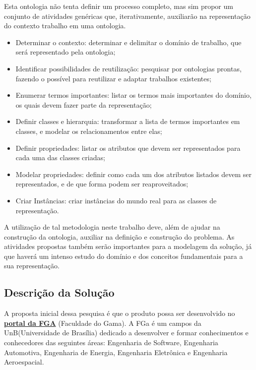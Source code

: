 Esta ontologia não tenta definir um processo completo, mas sim propor um conjunto de atividades genéricas que, iterativamente, auxiliarão na representação do contexto trabalho em uma ontologia.

\begin{itemize}
	\item Determinar o contexto: determinar e delimitar o domínio de trabalho, que será representado pela ontologia;
	\item Identificar possibilidades de reutilização: pesquisar por ontologias prontas, fazendo o possível para reutilizar e adaptar trabalhos existentes;
	\item Enumerar termos importantes: listar os termos mais importantes do domínio, os quais devem fazer parte da representação;
	\item Definir classes e hierarquia: transformar a lista de termos importantes em classes, e modelar os relacionamentos entre elas;
	\item Definir propriedades: listar os atributos que devem ser representados para cada uma das classes criadas;
	\item Modelar propriedades: definir como cada um dos atributos listados devem ser representados, e de que forma podem ser reaproveitados;
	\item Criar Instâncias: criar instâncias do mundo real para as classes de representação.
\end{itemize}

	A utilização de tal metodologia neste trabalho deve, além de ajudar na construção da ontologia, auxiliar na definição e construção do problema. As atividades propostas também serão importantes para a modelagem da solução, já que haverá um intenso estudo do domínio e dos conceitos fundamentais para a sua representação.

\subsection{Descrição da Solução} %
\label{sub:desc_da_solu_o}

	A proposta inicial dessa pesquisa é que o produto possa ser desenvolvido no \href{https://fga.unb.br/}{\textbf{portal da FGA}} (Faculdade do Gama). A FGa é um campos da UnB(Universidade de Brasília) dedicado a desenvolver e formar conhecimentos e conhecedores das seguintes áreas: Engenharia de Software, Engenharia Automotiva, Engenharia de Energia, Engenharia Eletrônica e Engenharia Aeroespacial. 

